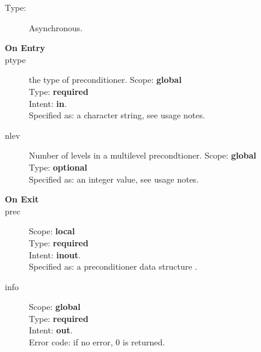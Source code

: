 

\begin{description}
\item[Type:] Asynchronous.
\item[\bf On Entry]
\item[ptype] the type of preconditioner. 
Scope: {\bf global} \\
Type: {\bf required}\\
Intent: {\bf in}.\\
Specified as: a character string, see usage notes.
\item[nlev] Number of levels in a multilevel  precondtioner. 
Scope: {\bf global} \\
Type: {\bf optional}\\
Specified as: an integer value, see usage notes. 
\item[\bf On Exit]

\item[prec] 
Scope: {\bf local} \\
Type: {\bf required}\\
Intent: {\bf inout}.\\
Specified as: a preconditioner data structure \precdata.
\item[info] 
Scope: {\bf global} \\
Type: {\bf required}\\
Intent: {\bf out}.\\
Error code: if no error, 0 is returned.
\end{description}
